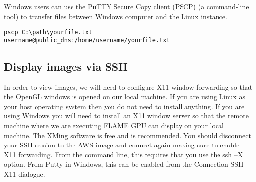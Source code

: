 Windows users can use the PuTTY Secure Copy client (PSCP) (a command-line tool) to transfer files between Windows computer and the Linux instance. 

\begin{verbatim}
pscp C:\path\yourfile.txt username@public_dns:/home/username/yourfile.txt
\end{verbatim}

\subsection{Display images via SSH}\label{sec:visualisation}
In order to view images, we will need to configure X11 window forwarding so that the OpenGL windows is opened on our local machine. If you are using Linux as your host operating system then you do not need to install anything. If you are using Windows you will need to install an X11 window server so that the remote machine where we are executing FLAME GPU can display on your local machine. The XMing software is free and is recommended. 
You should disconnect your SSH session to the AWS image and connect again making sure to enable X11 forwarding. From the command line, this requires that you use the ssh –X option. From Putty in Windows, this can be enabled from the Connection-SSH-X11 dialogue.